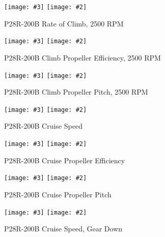 \documentclass[a4paper,10pt,pdftex]{article}
\newcommand{\jnxfig}[3][]{\ifmypdf\texttt{[image: \#3]}
  \else\texttt{[image: \#2]}\fi}
\begin{document}
\begin{figure}[!htbp]
  \begin{center}
    \jnxfig[angle=0,width=\linewidth]{p28rroc2500.eps}{p28rroc2500.pdf}
    \caption{P28R-200B Rate of Climb, 2500 RPM}
    \label{fig:p28rroc2500}
  \end{center}
\end{figure}

\begin{figure}[!htbp]
  \begin{center}
    \jnxfig[angle=0,width=\linewidth]{p28rroceff2500.eps}{p28rroceff2500.pdf}
    \caption{P28R-200B Climb Propeller Efficiency, 2500 RPM}
    \label{fig:p28rroceff2500}
  \end{center}
\end{figure}

\begin{figure}[!htbp]
  \begin{center}
    \jnxfig[angle=0,width=\linewidth]{p28rrocpitch2500.eps}{p28rrocpitch2500.pdf}
    \caption{P28R-200B Climb Propeller Pitch, 2500 RPM}
    \label{fig:p28rrocpitch2500}
  \end{center}
\end{figure}
\clearpage

\begin{figure}[!htbp]
  \begin{center}
    \jnxfig[angle=0,width=\linewidth]{p28rcruisespeed.eps}{p28rcruisespeed.pdf}
    \caption{P28R-200B Cruise Speed}
    \label{fig:p28rcruisespeed}
  \end{center}
\end{figure}

\begin{figure}[!htbp]
  \begin{center}
    \jnxfig[angle=0,width=\linewidth]{p28rcruiseeff.eps}{p28rcruiseeff.pdf}
    \caption{P28R-200B Cruise Propeller Efficiency}
    \label{fig:p28rcruiseeff}
  \end{center}
\end{figure}

\begin{figure}[!htbp]
  \begin{center}
    \jnxfig[angle=0,width=\linewidth]{p28rcruisepitch.eps}{p28rcruisepitch.pdf}
    \caption{P28R-200B Cruise Propeller Pitch}
    \label{fig:p28rcruisepitch}
  \end{center}
\end{figure}

\begin{figure}[!htbp]
  \begin{center}
    \jnxfig[angle=0,width=\linewidth]{p28rcruisespeedgd.eps}{p28rcruisespeedgd.pdf}
    \caption{P28R-200B Cruise Speed, Gear Down}
    \label{fig:p28rcruisespeedgd}
  \end{center}
\end{figure}
\end{document}
